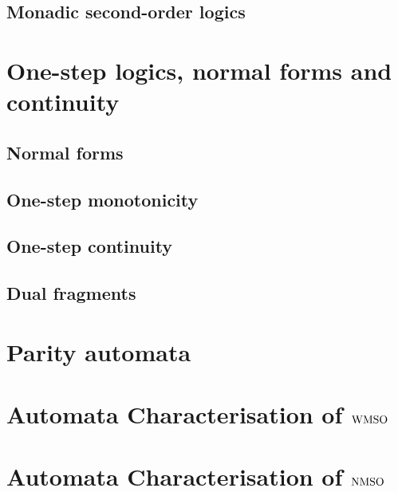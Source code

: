 \documentclass[prodmode,acmtecs]{acmsmall} %
\begin{document}
\subsection{Monadic second-order logics}\label{sec:prel-so}


\clearpage





\section{One-step logics, normal forms and continuity}\label{sec:onestep}

\subsection{Normal forms}\label{subsec:normalforms}

\subsection{One-step monotonicity}\label{subsec:one-stepmonot}

\subsection{One-step continuity}\label{subsec:one-stepcont}

\subsection{Dual fragments}\label{subsec:one-stepduals}


\clearpage


\section{Parity automata}\label{sec:parityaut}



\section{Automata Characterisation of $\mathrm{WMSO}$}\label{sec:autwmso}



\section{Automata Characterisation of $\mathrm{NMSO}$}\label{sec:autnmso}
\end{document}
